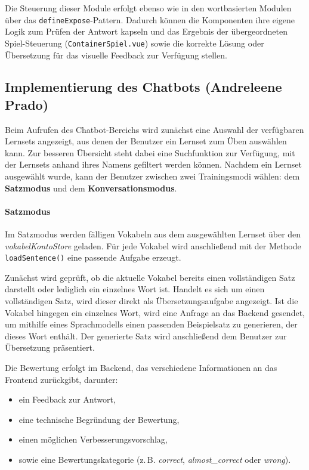 Die Steuerung dieser Module erfolgt ebenso wie in den wortbasierten Modulen über das \texttt{defineExpose}-Pattern. Dadurch können die Komponenten ihre eigene Logik zum Prüfen der Antwort kapseln und das Ergebnis 
der übergeordneten Spiel-Steuerung (\texttt{ContainerSpiel.vue}) sowie die korrekte Lösung oder Übersetzung für das visuelle Feedback zur Verfügung stellen. 

\subsection{Implementierung des Chatbots (Andreleene Prado)}

Beim Aufrufen des Chatbot-Bereichs wird zunächst eine Auswahl der verfügbaren Lernsets angezeigt, aus denen der Benutzer ein Lernset zum Üben auswählen kann. 
Zur besseren Übersicht steht dabei eine Suchfunktion zur Verfügung, mit der Lernsets anhand ihres Namens gefiltert werden können. 
Nachdem ein Lernset ausgewählt wurde, kann der Benutzer zwischen zwei Trainingsmodi wählen: dem \textbf{Satzmodus} und dem \textbf{Konversationsmodus}.

\paragraph{Satzmodus}

Im Satzmodus werden fälligen Vokabeln aus dem ausgewählten Lernset über den \textit{vokabelKontoStore} geladen. 
Für jede Vokabel wird anschließend mit der Methode \texttt{loadSentence()} eine passende Aufgabe erzeugt.

Zunächst wird geprüft, ob die aktuelle Vokabel bereits einen vollständigen Satz darstellt oder lediglich ein einzelnes Wort ist. 
Handelt es sich um einen vollständigen Satz, wird dieser direkt als Übersetzungsaufgabe angezeigt. 
Ist die Vokabel hingegen ein einzelnes Wort, wird eine Anfrage an das Backend gesendet, um mithilfe eines Sprachmodells einen passenden Beispielsatz zu generieren, der dieses Wort enthält. 
Der generierte Satz wird anschließend dem Benutzer zur Übersetzung präsentiert.

Die Bewertung erfolgt im Backend, das verschiedene Informationen an das Frontend zurückgibt, darunter:
\begin{itemize}
    \item ein Feedback zur Antwort,
    \item eine technische Begründung der Bewertung,
    \item einen möglichen Verbesserungsvorschlag,
    \item sowie eine Bewertungskategorie (z.\,B. \textit{correct}, \textit{almost\_correct} oder \textit{wrong}).
\end{itemize}

